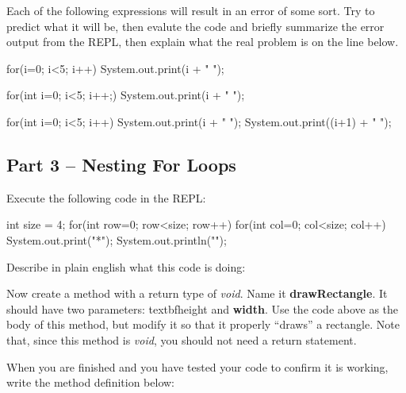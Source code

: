 \begin{eval}
Each of the following expressions will result in an error of some sort. Try to predict what it will be, then evalute the code and briefly summarize the error output from the REPL, then  explain what the real problem is on the line below.

\begin{sevalenum}
\item 
\begin{code}
for(i=0; i<5; i++) 
  System.out.print(i + " ");
\end{code}
\evallinethree



\item 
\begin{code}
for(int i=0; i<5; i++;) 
  System.out.print(i + " ");
\end{code}
\evallinethree



\item 
\begin{code}
for(int i=0; i<5; i++) 
  System.out.print(i + " ");
  System.out.print((i+1) + " ");
\end{code}
\evallinethree

\end{sevalenum}
\end{eval}


\initialbox

\subsection{Part 3 -- Nesting For Loops}

\begin{exer}
Execute the following code in the REPL:

\begin{code}
int size = 4;
for(int row=0; row<size; row++) {
  for(int col=0; col<size; col++) {
    System.out.print("*");
  }
  System.out.println("");
}
\end{code}

Describe in plain english what this code is doing:
\evallinethree
\end{exer}


\begin{exer}
Now create a method with a return type of \textit{void}. Name it \textbf{drawRectangle}. It should have two parameters: textbf{height} and \textbf{width}. Use the code above as the body of this method, but modify it so that it properly ``draws'' a rectangle. Note that, since this method is \textit{void}, you should not need a return statement. 

When you are finished and you have tested your code to confirm it is working, write the method definition below:

\evallineeight
\end{exer}


